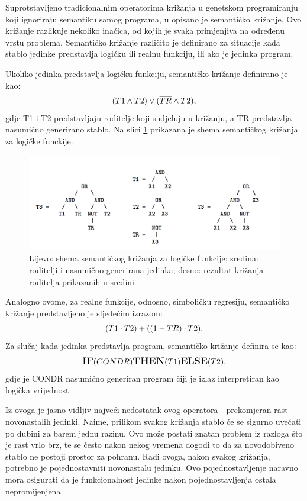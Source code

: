 Suprotstavljeno tradicionalnim operatorima križanja u genetskom programiranju koji ignoriraju semantiku samog programa, u \cite{crxSem} opisano je semantičko križanje. 
Ovo križanje razlikuje nekoliko inačica, od kojih je svaka primjenjiva na određenu vrstu problema. Semantičko križanje različito je definirano za situacije kada stablo jedinke predstavlja logičku ili realnu funkciju, ili ako je jedinka program.

Ukoliko jedinka predstavlja logičku funkciju, semantičko križanje definirano je kao:
 \begin{equation} 
\label{log}
 \large{ (T1 \land T2) \vee   (\overline{TR} \land T2) },
\end{equation}
gdje T1 i T2 predstavljaju roditelje koji sudjeluju u križanju, a TR predstavlja nasumično generirano stablo. Na slici \ref{semBool} prikazana je shema semantičkog križanja za logičke funckije.

 \begin{figure}[H]
	\centering
	\includegraphics[scale=0.4]{./slike/semBool1.png}
	\caption{Lijevo: shema semantičkog križanja za logičke funkcije; sredina: roditelji i nasumično generirana jedinka; desno: rezultat križanja roditelja prikazanih u sredini }
	\label{semBool}
\end{figure}
  
   
     Analogno ovome, za realne funkcije, odnosno, simboličku regresiju, semantičko križanje predstavljeno je sljedećim izrazom:
 \begin{equation} 
\label{log}
 \large{ (T1 \cdot T2) +   ((1-TR) \cdot T2) }.
\end{equation}
Za slučaj kada jedinka predstavlja program, semantičko križanje definira se kao:
 \begin{equation} 
\label{log}
 \large{ \textbf{IF}(CONDR) \textbf{THEN} (T1) \textbf{ELSE} (T2)},
\end{equation}
gdje je CONDR nasumično generiran program čiji je izlaz interpretiran kao logička vrijednost.

Iz ovoga je jasno vidljiv najveći nedostatak ovog operatora - prekomjeran rast novonastalih jedinki. Naime, prilikom svakog križanja stablo će se sigurno uvećati po dubini za barem jednu razinu. Ovo može postati znatan problem iz razloga što je rast vrlo brz, te se često nakon nekog vremena dogodi to da za novodobiveno stablo ne postoji prostor za pohranu. Radi ovoga, nakon svakog križanja, potrebno je pojednostavniti novonastalu jedinku. Ovo pojednostavljenje naravno mora osigurati da je funkcionalnost jedinke nakon pojednostavljenja ostala nepromijenjena.

